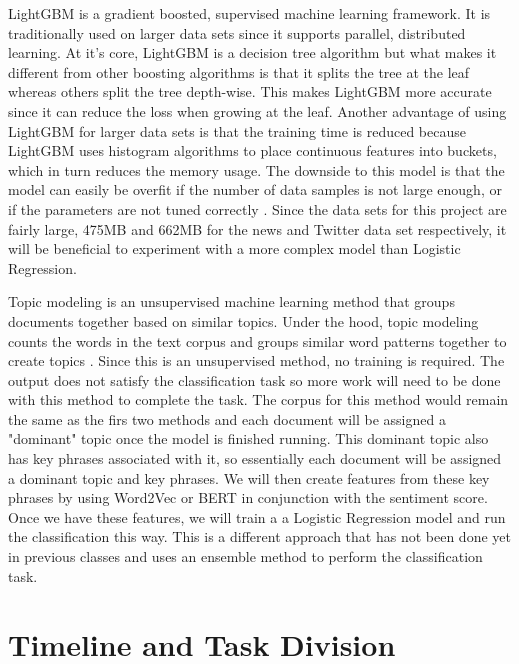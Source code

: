 \documentclass[conference]{IEEEtran}
\begin{document}
LightGBM is a gradient boosted, supervised machine learning framework. It is traditionally used on larger data sets since it supports parallel, distributed learning. At it's core, LightGBM is a decision tree algorithm but what makes it different from other boosting algorithms is that it splits the tree at the leaf whereas others split the tree depth-wise. This makes LightGBM more accurate since it can reduce the loss when growing at the leaf. Another advantage of using LightGBM for larger data sets is that the training time is reduced because LightGBM uses histogram algorithms to place continuous features into buckets, which in turn reduces the memory usage. The downside to this model is that the model can easily be overfit if the number of data samples is not large enough, or if the parameters are not tuned correctly \cite{b12}. Since the data sets for this project are fairly large, 475MB and 662MB for the news and Twitter data set respectively, it will be beneficial to experiment with a more complex model than Logistic Regression.

Topic modeling is an unsupervised machine learning method that groups documents together based on similar topics. Under the hood, topic modeling counts the words in the text corpus and groups similar word patterns together to create topics \cite{b5}. Since this is an unsupervised method, no training is required. The output does not satisfy the classification task so more work will need to be done with this method to complete the task. The corpus for this method would remain the same as the firs two methods and each document will be assigned a "dominant" topic once the model is finished running. This dominant topic also has key phrases associated with it, so essentially each document will be assigned a dominant topic and key phrases. We will then create features from these key phrases by using Word2Vec or BERT in conjunction with the sentiment score. Once we have these features, we will train a a Logistic Regression model and run the classification this way. This is a different approach that has not been done yet in previous classes and uses an ensemble method to perform the classification task.


\section*{Timeline and Task Division}
\end{document}
